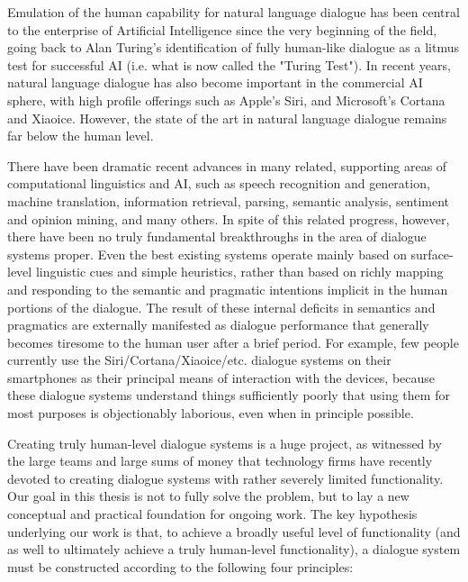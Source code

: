 \begin{englishabstract}

Emulation of the human capability for natural language dialogue has been central to the enterprise of Artificial Intelligence since the very beginning of the field, going back to Alan Turing's identification of fully human-like dialogue as a litmus test for successful AI (i.e. what is now called the "Turing Test").  In recent years, natural language dialogue has also become important in the commercial AI sphere, with high profile offerings such as Apple's Siri, and Microsoft's Cortana and Xiaoice.  However, the state of the art in natural language dialogue remains far below the human level.  

There have been dramatic recent advances in many related, supporting areas of computational linguistics and AI, such as speech recognition and generation, machine translation, information retrieval, parsing, semantic analysis, sentiment and opinion mining, and many others.  In spite of this related progress, however, there have been no truly fundamental breakthroughs in the area of dialogue systems proper.  Even the best existing systems operate mainly based on surface-level linguistic cues and simple heuristics, rather than based on richly mapping and responding to the semantic and pragmatic intentions implicit in the human portions of the dialogue.  The result of these internal deficits in semantics and pragmatics are externally  manifested as dialogue performance that generally becomes tiresome to the human user after a brief period.  For example, few people currently use the Siri/Cortana/Xiaoice/etc. dialogue systems on their smartphones as their principal means of interaction with the devices, because these dialogue systems understand things sufficiently poorly that using them for most purposes is objectionably laborious, even when in principle possible.

Creating truly human-level dialogue systems is a huge project, as witnessed by the large teams and large sums of money that technology firms have recently devoted to creating dialogue systems with rather severely limited functionality.   Our goal in this thesis is not to fully solve the problem, but to lay a new conceptual and practical foundation for ongoing work.  The key hypothesis underlying our work is that, to achieve a broadly useful level of functionality (and as well to ultimately achieve a truly human-level functionality), a dialogue system must be constructed according to the following four principles:


\end{englishabstract}
